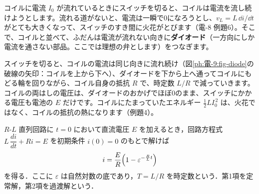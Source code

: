 \noindent\begin{minipage}[c]{0.6\linewidth}\raggedright
コイルに電流 $I_0$ が流れているときにスイッチを切ると、コイルは電流を流し続けようとします。流れる道がないと、電流は一瞬で0になろうとし、$v_L=L\,\dd i/\dd t$ がとても大きくなって、スイッチのすき間に火花がとびます（電-8 例題6）。そこで、コイルと並べて、ふだんは電流が流れない向きに\textbf{ダイオード}（一方向にしか電流を通さない部品。ここでは理想の弁とします）をつなぎます。
\end{minipage}\hfill
\begin{minipage}[c]{0.37\linewidth}\centering
{}
\label{ph:電-9:fig-diode}
\end{minipage}
\par\vspace{3pt}
スイッチを切ると、コイルの電流は同じ向きに流れ続け（図\ref{ph:電-9:fig-diode}の破線の矢印：コイルを上から下へ）、ダイオードを下から上へ通ってコイルにもどる輪を回りながら、コイル自身の抵抗 $R$ で、時定数 $L/R$ で減っていきます。コイルの両はしの電圧は、ダイオードのおかげでほぼ0のまま、スイッチにかかる電圧も電池の $E$ だけです。コイルにたまっていたエネルギー $\tfrac12LI_0^{\,2}$ は、火花ではなく、コイルの抵抗の熱になります（例題4）。

\begin{senmonsho}[電気回路の専門書の書き方]
\begin{bkhonbun}
$R$-$L$ 直列回路に $t=0$ において直流電圧 $E$ を加えるとき，回路方程式 $L\,\dfrac{di}{dt}+Ri=E$ を初期条件 $i(0)=0$ のもとで解けば
\[ i=\frac{E}{R}\Bigl(1-\varepsilon^{-\frac{R}{L}t}\Bigr) \]
を得る．ここに $\varepsilon$ は自然対数の底であり，$T=L/R$ を時定数という．第1項を定常解，第2項を過渡解という．
\end{bkhonbun}
\end{senmonsho}

